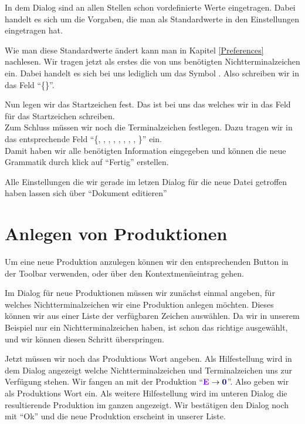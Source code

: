 In dem Dialog sind an allen Stellen schon vordefinierte Werte eingetragen.
Dabei handelt es sich um die Vorgaben, die man als Standardwerte in den
Einstellungen eingetragen hat.

Wie man diese Standardwerte ändert kann man in Kapitel \ref{Preferences}
nachlesen. Wir tragen jetzt als erstes die von uns benötigten
Nichtterminalzeichen ein. Dabei handelt es sich bei uns lediglich um das Symbol
. Also schreiben wir in das Feld
"`\{\}"'.\vspace{10pt}

Nun legen wir das Startzeichen fest. Das ist bei uns das 
welches wir in das Feld für das Startzeichen schreiben.\\
Zum Schluss müssen wir noch die Terminalzeichen festlegen. Dazu tragen
wir in das entsprechende Feld "`\{, ,
, , \TerminalSymbol{-}, \TerminalSymbol{+},
\TerminalSymbol{*}, \TerminalSymbol{(}, \TerminalSymbol{)}\}"' ein.\\ Damit
haben wir alle benötigten Information eingegeben und können die neue Grammatik durch klick auf "`Fertig"' erstellen.\vspace{10pt}

Alle Einstellungen die wir gerade im letzen Dialog für die neue Datei getroffen
haben lassen sich über "`Dokument editieren"'

\section{Anlegen von Produktionen}

Um eine neue Produktion anzulegen können wir den entsprechenden Button in der
Toolbar verwenden, oder über den Kontextmenüeintrag gehen.\vspace{10pt}

Im Dialog für neue Produktionen müssen wir zunächst einmal angeben, für welches
Nichtterminalzeichen wir eine Produktion anlegen möchten. Dieses können wir aus
einer Liste der verfügbaren Zeichen auswählen. Da wir in unserem Beispiel nur
ein Nichtterminalzeichen haben, ist schon das richtige ausgewählt, und wir
können diesen Schritt überspringen.\vspace{10pt}

Jetzt müssen wir noch das Produktions Wort angeben. Als Hilfestellung wird in
dem Dialog angezeigt welche Nichtterminalzeichen und Terminalzeichen uns zur
Verfügung stehen. Wir fangen an mit der Produktion "`$\StartSymbol{E} \to
\TerminalSymbol{0}$"'. Also geben wir als Produktions Wort 
ein. Als weitere Hilfestellung wird im unteren Dialog die resultierende Produktion im ganzen angezeigt. Wir bestätigen den
Dialog noch mit "`Ok"' und die neue Produktion erscheint in unserer Liste.\vspace{10pt}

